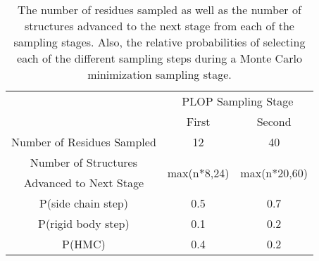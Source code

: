 \begin{table}[h]
    \centering
    \begin{tabular}{|c|c|c|}
        \cline{2-3}
        \multicolumn{1}{r|}{~}                       & \multicolumn{2}{c|}{PLOP Sampling Stage} \\
        \cline{2-3}
        \multicolumn{1}{r|}{~}                       & First                        & Second                        \\
        \hline
        Number of Residues Sampled                   & 12                           & 40                            \\
        \vspace{-1.5ex}
        Number of Structures                         & \multirow{2}{*}{max(n*8,24)} & \multirow{2}{*}{max(n*20,60)} \\
        Advanced to Next Stage                       &                              &                               \\
        P(side chain step)                           & 0.5                          & 0.7                           \\
        P(rigid body step)                           & 0.1                          & 0.2                           \\
        P(HMC)                                       & 0.4                          & 0.2                           \\
        \hline
    \end{tabular}
    \caption{The number of residues sampled as well as the number of structures advanced to the next stage from each of the sampling stages.
Also, the relative probabilities of selecting each of the different sampling steps during a Monte Carlo minimization sampling stage.}
    \label{table:mmc_params}
\end{table}

